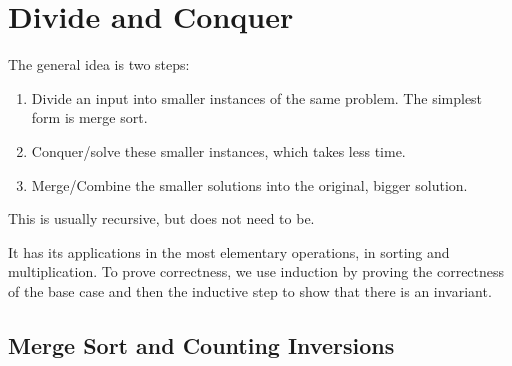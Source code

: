 \documentclass{article}
\begin{document}
    \begin{definition}[QR Decomposition]
      
    \end{definition}

    \begin{definition}[LU Decomposition]
      
    \end{definition}

    \begin{definition}
      
    \end{definition}

\section{Divide and Conquer} 

  \begin{definition}
    The general idea is two steps: 
    \begin{enumerate}
      \item Divide an input into smaller instances of the same problem. The simplest form is merge sort. 
      \item Conquer/solve these smaller instances, which takes less time. 
      \item Merge/Combine the smaller solutions into the original, bigger solution. 
    \end{enumerate}
    This is usually recursive, but does not need to be. 
  \end{definition}

  It has its applications in the most elementary operations, in sorting and multiplication. To prove correctness, we use induction by proving the correctness of the base case and then the inductive step to show that there is an invariant. 

  \subsection{Merge Sort and Counting Inversions}
\end{document}
